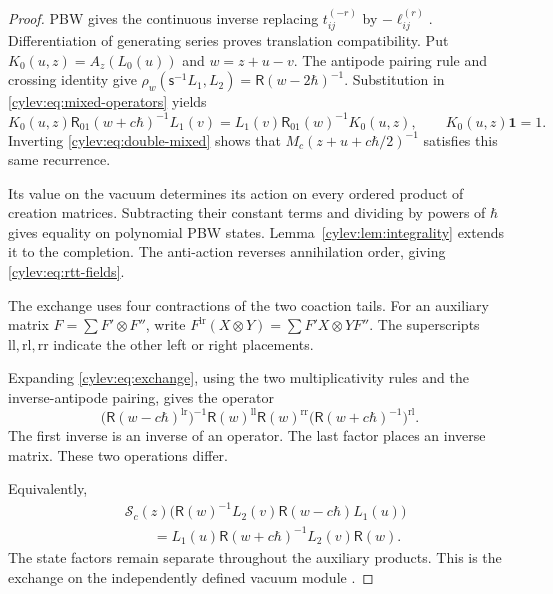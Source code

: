 \begin{proof}
PBW gives the continuous inverse replacing $t_{ij}^{(-r)}$ by
$-\ell_{ij}^{(r)}$.
Differentiation of generating series proves translation compatibility.
Put $K_0(u,z)=A_z(L_0(u))$ and $w=z+u-v$.
The antipode pairing rule and crossing identity give
$\rho_w(\mathsf s^{-1}L_1,L_2)=\mathsf R(w-2\hbar)^{-1}$.
Substitution in \eqref{cylev:eq:mixed-operators} yields
\begin{equation}\label{cylev:eq:annihilation-recurrence}
 K_0(u,z)\mathsf R_{01}(w+c\hbar)^{-1}L_1(v)
       =L_1(v)\mathsf R_{01}(w)^{-1}K_0(u,z),
 \qquad K_0(u,z)\mathbf1=1.
\end{equation}
Inverting \eqref{cylev:eq:double-mixed} shows that
$M_c(z+u+c\hbar/2)^{-1}$ satisfies this same recurrence.

Its value on the vacuum determines its action on every ordered
product of creation matrices. Subtracting their constant terms and
dividing by powers of $\hbar$ gives equality on polynomial PBW states.
Lemma~\ref{cylev:lem:integrality} extends it to the completion.
The anti-action reverses annihilation order, giving
\eqref{cylev:eq:rtt-fields}.

The exchange uses four contractions of the two coaction tails.
For an auxiliary matrix $F=\sum F'\otimes F''$, write
$F^{\mathrm{lr}}(X\otimes Y)=\sum F'X\otimes YF''$.
The superscripts $\mathrm{ll},\mathrm{rl},\mathrm{rr}$ indicate the
other left or right placements.

Expanding \eqref{cylev:eq:exchange}, using the two multiplicativity
rules and the inverse-antipode pairing, gives the operator
\begin{equation}\label{cylev:eq:four-contractions}
 \bigl(\mathsf R(w-c\hbar)^{\mathrm{lr}}\bigr)^{-1}
       \mathsf R(w)^{\mathrm{ll}}\mathsf R(w)^{\mathrm{rr}}
       \bigl(\mathsf R(w+c\hbar)^{-1}\bigr)^{\mathrm{rl}}.
\end{equation}
The first inverse is an inverse of an operator.
The last factor places an inverse matrix. These two operations differ.

Equivalently,
\begin{equation}\label{cylev:eq:exchange-comparison}
\begin{split}
 &\mathcal S_c(z)\bigl(\mathsf R(w)^{-1}L_2(v)
                       \mathsf R(w-c\hbar)L_1(u)\bigr)\\
 &\qquad=L_1(u)\mathsf R(w+c\hbar)^{-1}L_2(v)\mathsf R(w).
\end{split}
\end{equation}
The state factors remain separate throughout the auxiliary products.
This is the exchange on the independently defined vacuum module
\cite[Theorem~4.1, equations~(4.17)--(4.19)]{JingKozicMolevYang2017}.


\end{proof}

